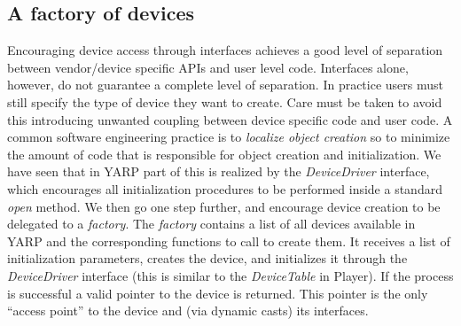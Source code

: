 \subsection{A factory of devices}
Encouraging device access through 
interfaces achieves a good level of separation between vendor/device 
specific APIs and user level code. Interfaces alone, however, do not 
guarantee a complete level of separation. In practice users must still 
specify the type of device they want to create. Care must be taken to 
avoid  this introducing unwanted coupling between device specific code and 
user code. A common software 
engineering practice is to \emph{localize object creation} so to 
minimize the amount of code that is responsible for object creation 
and initialization. 
We have seen that in YARP part of this is realized by the 
\emph{DeviceDriver} interface, which encourages all initialization procedures 
to be performed inside a standard \emph{open} method. 
We then go one step further, and encourage device creation to be
delegated to a \emph{factory}. The \emph{factory} contains a list of 
all devices available in YARP and the corresponding functions to call 
to create them. It receives a list of initialization parameters, 
creates the device, and initializes it 
through the \emph{DeviceDriver} interface (this is similar to
the \emph{DeviceTable} in Player).
If the process is successful
a valid pointer to the device is returned. This pointer is the only 
``access point'' to the device and (via dynamic casts) its interfaces.
%
%

%
%
%
%

